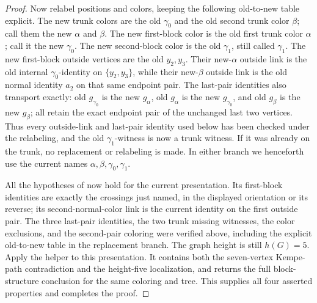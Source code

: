 \begin{proof}
Now relabel positions and colors, keeping the following old-to-new table
explicit.  The new trunk colors are the old $\gamma_0$ and the old second
trunk color $\beta$; call them the new $\alpha$ and $\beta$.  The new
first-block color is the old first trunk color $\alpha$; call it the new
$\gamma_0$.  The new second-block color is the old $\gamma_1$, still
called $\gamma_1$.  The new first-block outside vertices are the old
$y_2,y_3$.  Their new-$\alpha$ outside link is the old internal
$\gamma_0$-identity on $\{y_2,y_3\}$, while their new-$\beta$ outside
link is the old normal identity $a_2$ on that same endpoint pair.  The
last-pair identities also transport exactly: old $g_{\gamma_0}$ is the
new $g_\alpha$, old $g_\alpha$ is the new $g_{\gamma_0}$, and old
$g_\beta$ is the new $g_\beta$; all retain the exact endpoint pair of the
unchanged last two vertices.  Thus every outside-link and last-pair
identity used below has been checked under the relabeling, and the old
$\gamma_1$-witness is now a trunk witness.  If it was already on the
trunk, no replacement or relabeling is made.  In either branch we
henceforth use the current names $\alpha,\beta,\gamma_0,\gamma_1$.

All the hypotheses of
 now hold for the
current presentation.  Its first-block identities are exactly the
crossings just named, in the displayed orientation or its reverse; its
second-normal-color link is the current identity on the first outside
pair.  The three last-pair identities, the two trunk missing witnesses,
the color exclusions, and the second-pair coloring were verified above,
including the explicit old-to-new table in the replacement branch.
The graph height is still $h(G)=5$.  Apply the helper to this presentation.
It contains both the seven-vertex Kempe-path contradiction and the
height-five localization, and returns the full block-structure conclusion
for the same coloring and tree.  This supplies all four asserted
properties and completes the proof.
\end{proof}
